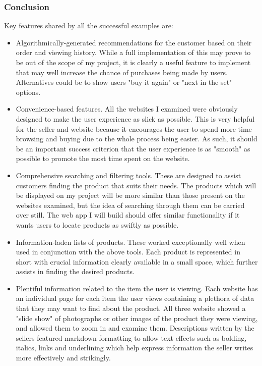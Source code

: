 ﻿\documentclass{article}
\begin{document}
    \subsubsection{Conclusion}
    Key features shared by all the successful examples are:
    \begin{itemize}
    \item Algorithmically-generated recommendations for the customer based on their order and viewing history.
    While a full implementation of this may prove to be out of the scope of my project, it is clearly a useful feature to implement that may well increase the chance of purchases being made by users.
    Alternatives could be to show users "buy it again" or "next in the set" options.
    \item Convenience-based features.
    All the websites I examined were obviously designed to make the user experience as slick as possible.
    This is very helpful for the seller and website because it encourages the user to spend more time browsing and buying due to the whole process being easier.
    As such, it should be an important success criterion that the user experience is as "smooth" as possible to promote the most time spent on the website.
    \item Comprehensive searching and filtering tools.
    These are designed to assist customers finding the product that suits their needs.
    The products which will be displayed on my project will be more similar than those present on the websites examined, but the idea of searching through them can be carried over still.
    The web app I will build should offer similar functionality if it wants users to locate products as swiftly as possible.
    \item Information-laden lists of products.
    These worked exceptionally well when used in conjunction with the above tools.
    Each product is represented in short with crucial information clearly available in a small space, which further assists in finding the desired products.
    \item Plentiful information related to the item the user is viewing.
    Each website has an individual page for each item the user views containing a plethora of data that they may want to find about the product.
    All three website showed a "slide show" of photographs or other images of the product they were viewing, and allowed them to zoom in and examine them.
    Descriptions written by the sellers featured markdown formatting to allow text effects such as bolding, italics, links and underlining which help express information the seller writes more effectively and strikingly.

\end{itemize}
\end{document}
